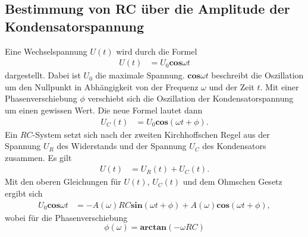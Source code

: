 
\subsection{Bestimmung von RC über die Amplitude der Kondensatorspannung}
Eine Wechselspannung $U(t)$ wird durch die Formel 
\begin{align*} 
    U(t)&= U_{0} \mathbf{cos}\omega t 
\end{align*}
dargestellt. Dabei ist $U_{0}$ die maximale Spannung. $\mathbf{cos}\omega t$ beschreibt die Oszillation um den Nullpunkt in Abhängigkeit von der Frequenz $\omega$ und der Zeit $t$. 
Mit einer Phasenverschiebung $\phi$ verschiebt sich die Oszillation der Kondensatorspannung um einen gewissen Wert. Die neue Formel lautet dann 
\begin{align*} 
    U_{C}(t)&= U_{0} \mathbf{cos}(\omega t + \phi).
\end{align*}
Ein $RC$-System setzt sich nach der zweiten Kirchhoffschen Regel aus der Spannung $U_{R}$ des Widerstands und der Spannung $U_{C}$ des Kondensators zusammen.
Es gilt 
\begin{align*} 
    U(t) &= U_{R}(t) + U_{C}(t).
\end{align*}
Mit den oberen Gleichungen für $U(t)$, $U_{C}(t)$ und dem Ohmschen Gesetz ergibt sich 
\begin{align*} 
U_{0} \mathbf{cos}\omega t &= -A(\omega) RC \mathbf{sin}(\omega t + \phi) + A(\omega) \mathbf{cos}(\omega t + \phi),  
\end{align*}
wobei für die Phasenverschiebung 
\begin{equation} 
\phi (\omega) = \mathbf{arctan}(-\omega RC) 
\label{eqn: phi}
\end{equation}
